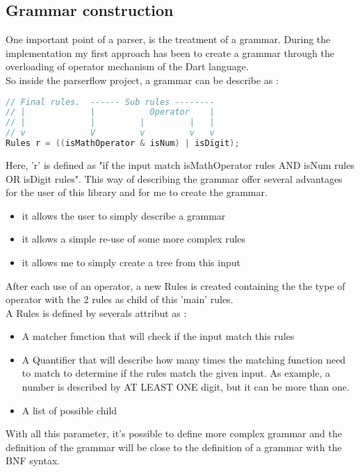 \subsection{Grammar construction}
One important point of a parser, is the treatment of a grammar. During the implementation my first approach has been to create a grammar through the overloading of operator mechanism of the Dart language.\\
So inside the parserflow project, a grammar can be describe as :
\begin{lstlisting}[language=C++, caption=Rules creation]
// Final rules.  ------ Sub rules --------
// |             |           Operator    |
// |             |         |         |   |
// v             V         v         v   v
Rules r = ((isMathOperator & isNum) | isDigit);
\end{lstlisting}
Here, 'r' is defined as "if the input match isMathOperator rules AND isNum rules OR isDigit rules". This way of describing the grammar offer several advantages for the user of this library and for me to create the grammar.
\begin{itemize}
\item it allows the user to simply describe a grammar
\item it allows a simple re-use of some more complex rules
\item it allows me to simply create a tree from this input
\end{itemize}
After each use of an operator, a new Rules is created containing the the type of operator with the 2 rules as child of this 'main' rules.\\
A Rules is defined by severals attribut as :
\begin{itemize}
\item A matcher function that will check if the input match this rules
\item A Quantifier that will describe how many times the matching function need to match to determine if the rules match the given input. As example, a number is described by AT LEAST ONE digit, but it can be more than one.
\item A list of possible child
\end{itemize}
With all this parameter, it's possible to define more complex grammar and the definition of the grammar will be close to the definition of a grammar with the BNF syntax.

